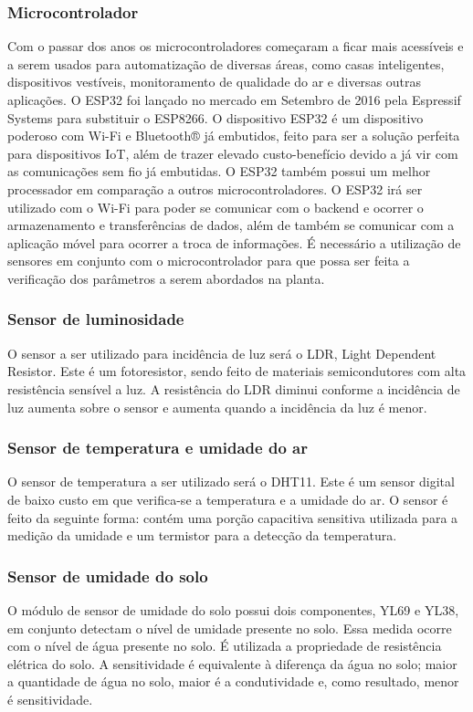 \documentclass[conference]{IEEEtran}
\begin{document}
\subsubsection{Microcontrolador}
Com o passar dos anos os microcontroladores começaram a ficar mais acessíveis e a serem usados para automatização de diversas áreas, como casas inteligentes, dispositivos vestíveis, monitoramento de qualidade do ar e diversas outras aplicações.
O ESP32 foi lançado no mercado em Setembro de 2016 pela Espressif Systems para substituir o ESP8266. O dispositivo ESP32 é um dispositivo poderoso com Wi-Fi e Bluetooth® já embutidos, feito para ser a solução perfeita para dispositivos IoT,\cite{b8} além de trazer elevado custo-benefício devido a já vir com as comunicações sem fio já embutidas. O ESP32 também possui um melhor processador em comparação a outros microcontroladores.\cite{b8}
O ESP32 irá ser utilizado com o Wi-Fi para poder se comunicar com o backend e ocorrer o armazenamento e transferências de dados, além de também se comunicar com a aplicação móvel para ocorrer a troca de informações. É necessário a utilização de sensores em conjunto com o microcontrolador para que possa ser feita a verificação dos parâmetros a serem abordados na planta.

\subsubsection{Sensor de luminosidade}
O sensor a ser utilizado para incidência de luz será o LDR, Light Dependent Resistor. Este é um fotoresistor, sendo feito de materiais semicondutores com alta resistência sensível a luz. A resistência do LDR diminui conforme a incidência de luz aumenta sobre o sensor e aumenta quando a incidência da luz é menor.\cite{b11}

\subsubsection{Sensor de temperatura e umidade do ar}
O sensor de temperatura a ser utilizado será o DHT11. Este é um sensor digital de baixo custo em que verifica-se a temperatura e a umidade do ar. O sensor é feito da seguinte forma: contém uma porção capacitiva sensitiva utilizada para a medição da umidade e um termistor para a detecção da temperatura. \cite{b9, b10}

\subsubsection{Sensor de umidade do solo}
O módulo de sensor de umidade do solo possui dois componentes, YL69 e YL38, em conjunto detectam o nível de umidade presente no solo. Essa medida ocorre com o nível de água presente no solo. É utilizada a propriedade de resistência elétrica do solo. A sensitividade é equivalente à diferença da água no solo; maior a quantidade de água no solo, maior é a condutividade e, como resultado, menor é sensitividade. \cite{b9, b10}
\end{document}
